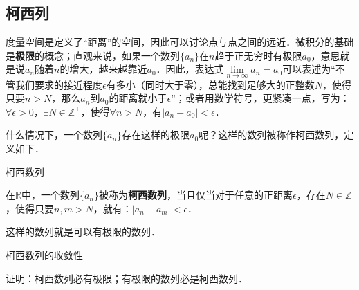 

\subsection{柯西列}

度量空间是定义了“距离”的空间，因此可以讨论点与点之间的远近．微积分的基础是\textbf{极限}的概念；直观来说，如果一个数列$\{a_n\}$在$n$趋于正无穷时有极限$a_0$，意思就是说$a_n$随着$n$的增大，越来越靠近$a_0$．因此，表达式$\lim\limits_{n\rightarrow\infty}a_n=a_0$可以表述为“不管我们要求的接近程度$\epsilon$有多小（同时大于零），总能找到足够大的正整数$N$，使得只要$n>N$，那么$a_n$到$a_0$的距离就小于$\epsilon$”；或者用数学符号，更紧凑一点，写为：$\forall\epsilon>0$，$\exists N\in\mathbb{Z}^+$，使得$\forall n>N$，有$|a_n-a_0|<\epsilon$．

什么情况下，一个数列$\{a_n\}$存在这样的极限$a_0$呢？这样的数列被称作柯西数列，定义如下．

\begin{definition}{柯西数列}

在$\mathbb{R}$中，一个数列$\{a_n\}$被称为\textbf{柯西数列}，当且仅当对于任意的正距离$\epsilon$，存在$N\in\mathbb{Z}$，使得只要$n, m>N$，就有：$|a_n-a_m|<\epsilon$．

\end{definition}

这样的数列就是可以有极限的数列．

\begin{exercise}{柯西数列的收敛性}

证明：柯西数列必有极限；有极限的数列必是柯西数列．

\end{exercise}


